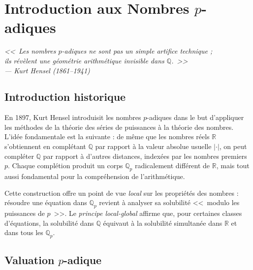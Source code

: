 \documentclass[12pt,a4paper,openany]{book}
\theoremstyle{definition}
\theoremstyle{plain}
\theoremstyle{remark}
\newcommand{\Q}{\mathbb{Q}}
\newcommand{\R}{\mathbb{R}}
\begin{document}

\chapter{Introduction aux Nombres \texorpdfstring{$p$}{p}-adiques}
\label{chap:p-adiques}

\begin{center}
\itshape
<<~Les nombres $p$-adiques ne sont pas un simple artifice technique ;\\
ils révèlent une géométrie arithmétique invisible dans $\Q$.~>>\\[4pt]
--- Kurt Hensel (1861--1941)
\end{center}

\bigskip

\section{Introduction historique}
\label{sec:p-adic-intro}

En 1897, Kurt Hensel introduisit les nombres $p$-adiques
dans le but d'appliquer les méthodes de la théorie des séries de puissances
à la théorie des nombres. L'idée fondamentale est la suivante : de même que les
nombres réels $\R$ s'obtiennent en complétant $\Q$ par rapport à la valeur absolue
usuelle $|\cdot|$, on peut compléter $\Q$ par rapport à d'autres distances, indexées
par les nombres premiers $p$. Chaque complétion produit un corps
$\Q_p$\index{Qp@$\Q_p$} radicalement différent de $\R$, mais tout aussi
fondamental pour la compréhension de l'arithmétique.

Cette construction offre un point de vue \emph{local} sur les propriétés des
nombres : résoudre une équation dans $\Q_p$ revient à analyser sa solubilité
<<~modulo les puissances de $p$~>>. Le \emph{principe local-global} affirme que, pour certaines classes d'équations, la solubilité dans
$\Q$ équivaut à la solubilité simultanée dans $\R$ et dans tous les $\Q_p$.

\section{Valuation \texorpdfstring{$p$}{p}-adique}
\label{sec:valuation-p-adique}
\end{document}
